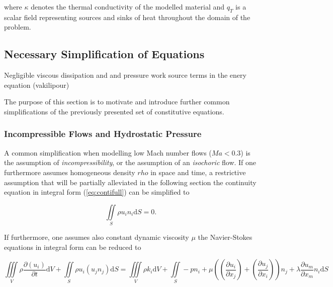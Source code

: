     where \(\kappa\) denotes the thermal conductivity of the modelled material and \(q_T\) is a scalar field representing sources and sinks of heat throughout the domain of the problem. 


    \subsection{Necessary Simplification of Equations}
        Negligible viscous dissipation and and pressure work source terms in the enery equation (vakilipour)

        The purpose of this section is to motivate and introduce further common simplifications of the previously presented set of constitutive equations. 

      \subsubsection{Incompressible Flows and Hydrostatic Pressure}

      A common simplification when modelling low Mach number flows (\(Ma < 0.3\)) is the assumption of \textit{incompressibility}, or the assumption of an \textit{isochoric} flow. If one furthermore assumes homogeneous density \(rho\) in space and time, a restrictive assumption that will be partially alleviated in the following section the continuity equation in integral form (\ref{eq:contifull}) can be simplified to

      \begin{equation}
        \label{eq:contiinc}
        \iint\limits_S \rho u_i n_i \mathrm{d}S = 0.
      \end{equation}

      If furthermore, one assumes also constant dynamic viscosity \(\mu\) the Navier-Stokes equations in integral form can be reduced to 

    \begin{equation}
      \iiint\limits_V \rho \frac{\partial \left( u_i \right)}{\partial t} \mathrm{d}V 
      + \iint\limits_S \rho u_i \left( u_j n_j \right) \mathrm{d}S 
      = \iiint\limits_V \rho k_i \mathrm{d}V 
      + \iint\limits_S -p n_i 
      + \mu \left( \left( \frac{\partial u_i}{\partial x_j} \right) + \left( \frac{\partial u_j}{\partial x_i} \right) \right) n_j 
      + \lambda \frac{\partial u_m}{\partial x_m} n_i 
      \mathrm{d}S
    \end{equation}
     

